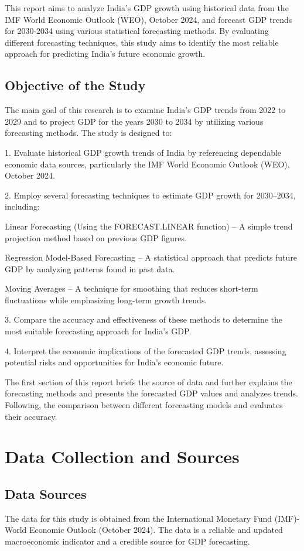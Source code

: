 \documentclass{article}
\begin{document}
This report aims to analyze India’s GDP growth using historical data from the IMF World Economic Outlook (WEO), October 2024, and forecast GDP trends for 2030-2034 using various statistical forecasting methods. By evaluating different forecasting techniques, this study aims to identify the most reliable approach for predicting India’s future economic growth.
\subsection{Objective of the Study}
The main goal of this research is to examine India's GDP trends from 2022 to 2029 and to project GDP for the years 2030 to 2034 by utilizing various forecasting methods. The study is designed to:

1. Evaluate historical GDP growth trends of India by referencing dependable economic data sources, particularly the IMF World Economic Outlook (WEO), October 2024.


2. Employ several forecasting techniques to estimate GDP growth for 2030–2034, including:


Linear Forecasting (Using the FORECAST.LINEAR function) – A simple trend projection method based on previous GDP figures.


Regression Model-Based Forecasting – A statistical approach that predicts future GDP by analyzing patterns found in past data.


Moving Averages – A technique for smoothing that reduces short-term fluctuations while emphasizing long-term growth trends.



3. Compare the accuracy and effectiveness of these methods to determine the most suitable forecasting approach for India's GDP.


4. Interpret the economic implications of the forecasted GDP trends, assessing potential risks and opportunities for India’s economic future.


The first section of this report briefs the source of data and further explains the forecasting methods and presents the forecasted GDP values and analyzes trends. Following, the comparison between different forecasting models and evaluates their accuracy.

\section{Data Collection and Sources}
\subsection{Data Sources}
The data for this study is obtained from the International Monetary Fund (IMF)- World Economic Outlook (October 2024). The data is a reliable and updated macroeconomic indicator and a credible source for GDP forecasting.
\end{document}
